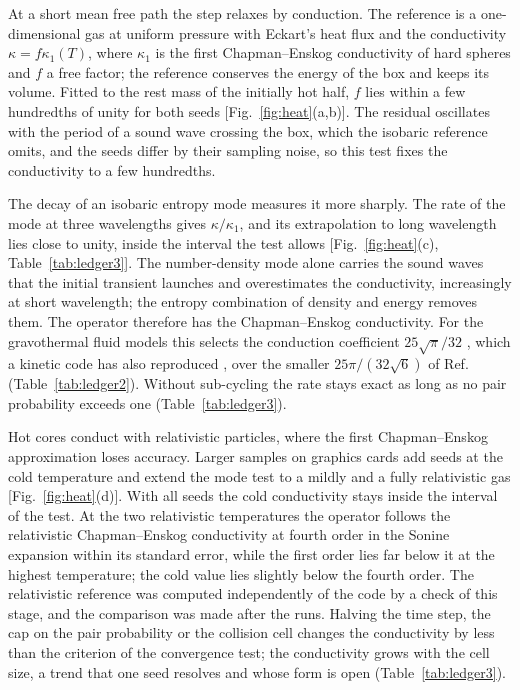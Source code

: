 \documentclass[aps,prd,twocolumn,10pt,superscriptaddress,nofootinbib,longbibliography,floatfix]{revtex4-2}
\begin{document}
At a short mean free path the step relaxes by conduction. The reference is a one-dimensional gas at uniform pressure with Eckart's heat flux and the conductivity $\kappa=f\kappa_1(T)$, where $\kappa_1$ is the first Chapman--Enskog conductivity of hard spheres and $f$ a free factor; the reference conserves the energy of the box and keeps its volume. Fitted to the rest mass of the initially hot half, $f$ lies within a few hundredths of unity for both seeds [Fig.~\ref{fig:heat}(a,b)]. The residual oscillates with the period of a sound wave crossing the box, which the isobaric reference omits, and the seeds differ by their sampling noise, so this test fixes the conductivity to a few hundredths.

The decay of an isobaric entropy mode measures it more sharply. The rate of the mode at three wavelengths gives $\kappa/\kappa_1$, and its extrapolation to long wavelength lies close to unity, inside the interval the test allows [Fig.~\ref{fig:heat}(c), Table~\ref{tab:ledger3}]. The number-density mode alone carries the sound waves that the initial transient launches and overestimates the conductivity, increasingly at short wavelength; the entropy combination of density and energy removes them. The operator therefore has the Chapman--Enskog conductivity. For the gravothermal fluid models this selects the conduction coefficient $25\sqrt{\pi}/32$ \cite{Koda:2011sidm,Gurian:2025sidm}, which a kinetic code has also reproduced \cite{Gurian:2025sidm}, over the smaller $25\pi/(32\sqrt6)$ of Ref.~\cite{Balberg:2002gt} (Table~\ref{tab:ledger2}). Without sub-cycling the rate stays exact as long as no pair probability exceeds one (Table~\ref{tab:ledger3}).

Hot cores conduct with relativistic particles, where the first Chapman--Enskog approximation loses accuracy. Larger samples on graphics cards add seeds at the cold temperature and extend the mode test to a mildly and a fully relativistic gas [Fig.~\ref{fig:heat}(d)]. With all seeds the cold conductivity stays inside the interval of the test. At the two relativistic temperatures the operator follows the relativistic Chapman--Enskog conductivity at fourth order in the Sonine expansion within its standard error, while the first order lies far below it at the highest temperature; the cold value lies slightly below the fourth order. The relativistic reference was computed independently of the code by a check of this stage, and the comparison was made after the runs. Halving the time step, the cap on the pair probability or the collision cell changes the conductivity by less than the criterion of the convergence test; the conductivity grows with the cell size, a trend that one seed resolves and whose form is open (Table~\ref{tab:ledger3}).
\end{document}
